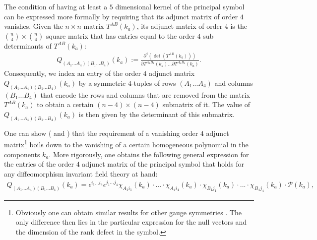 The condition of having at least a $5$ dimensional kernel of the principal symbol can be expressed more formally by requiring that its adjunct matrix of order $4$ vanishes. Given the $n \times n$ matrix $T^{AB}(k_a)$, its adjunct matrix of order $4$ is the $\binom{n}{4} \times \binom{n}{4}$ square matrix that has entries equal to the order $4$ sub determinants of $T^{AB}(k_a)$:
\begin{align}\label{MinorDef}
    Q_{(A_1...A_4) (B_1...B_4)}(k_a) := \frac{\partial^4 (\operatorname{det}(T^{AB}(k_a)))}{\partial T^{A_1 B_1}(k_a) ... \partial T^{A_4 B_4}(k_a)}.
\end{align}
Consequently, we index an entry of the order $4$ adjunct matrix $Q_{(A_1...A_4) (B_1...B_4)}(k_a)$ by a symmetric $4$-tuples of rows $(A_1...A_4)$ and columns $(B_1...B_4)$ that encode the rows and columns that are removed from the matrix $T^{AB}(k_a)$ to obtain a certain $(n-4) \times (n-4)$ submatrix of it. The value of $Q_{(A_1...A_4) (B_1...B_4)}(k_a)$ is then given by the determinant of this submatrix. 

One can show (\cite{2018PhRvD..97h4036D} and \cite{2009JPhA...42U5402I}) that the requirement of a vanishing order $4$ adjunct matrix\footnote{Obviously one can obtain similar results for other gauge symmetries \cite{2018PhRvD..97h4036D}. The only difference then lies in the particular expression for the null vectors and the dimension of the rank defect in the symbol.} boils down to the vanishing of a certain homogeneous polynomial in the components $k_a$. More rigorously, one obtains the following general expression for the entries of the order $4$ adjunct matrix of the principal symbol that holds for any diffeomorphism invariant field theory at hand:
\begin{align}\label{diffeoMinor}
    Q_{(A_1...A_4) (B_1...B_4)}(k_a) = \epsilon^{i_1...i_4} \epsilon^{j_1...j_4} \chi_{A_1i_1}(k_a) \cdot ... \cdot \chi_{A_4i_4}(k_a) \cdot \chi_{B_1j_1}(k_a) \cdot ... \cdot \chi_{B_4j_4}(k_a) \cdot \mathcal{P}(k_a),
\end{align}

